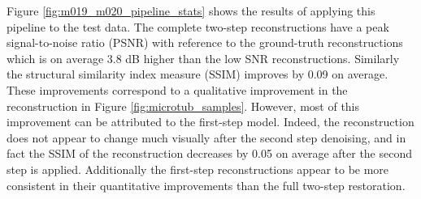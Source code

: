 \documentclass[12pt]{article}
\begin{document}
Figure \ref{fig:m019_m020_pipeline_stats} shows the results of applying this pipeline to the test data.
The complete two-step reconstructions have a peak signal-to-noise ratio (PSNR) with reference to the ground-truth reconstructions which is on average 3.8 dB higher than the low SNR reconstructions.
Similarly the structural similarity index measure (SSIM) improves by 0.09 on average.
These improvements correspond to a qualitative improvement in the reconstruction in Figure \ref{fig:microtub_samples}.
However, most of this improvement can be attributed to the first-step model.
Indeed, the reconstruction does not appear to change much visually after the second step denoising,
and in fact the SSIM of the reconstruction decreases by 0.05 on average after the second step is applied.
Additionally the first-step reconstructions appear to be more consistent in their quantitative improvements than the full two-step restoration.
\end{document}
